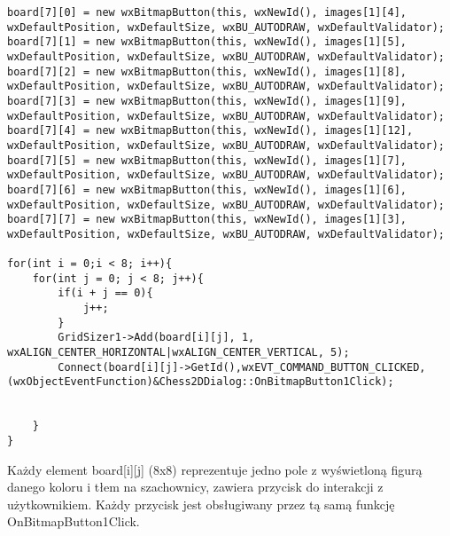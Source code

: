 \documentclass[]{report}
\begin{document}
\begin{lstlisting}
board[7][0] = new wxBitmapButton(this, wxNewId(), images[1][4], wxDefaultPosition, wxDefaultSize, wxBU_AUTODRAW, wxDefaultValidator);
board[7][1] = new wxBitmapButton(this, wxNewId(), images[1][5], wxDefaultPosition, wxDefaultSize, wxBU_AUTODRAW, wxDefaultValidator);
board[7][2] = new wxBitmapButton(this, wxNewId(), images[1][8], wxDefaultPosition, wxDefaultSize, wxBU_AUTODRAW, wxDefaultValidator);
board[7][3] = new wxBitmapButton(this, wxNewId(), images[1][9], wxDefaultPosition, wxDefaultSize, wxBU_AUTODRAW, wxDefaultValidator);
board[7][4] = new wxBitmapButton(this, wxNewId(), images[1][12], wxDefaultPosition, wxDefaultSize, wxBU_AUTODRAW, wxDefaultValidator);
board[7][5] = new wxBitmapButton(this, wxNewId(), images[1][7], wxDefaultPosition, wxDefaultSize, wxBU_AUTODRAW, wxDefaultValidator);
board[7][6] = new wxBitmapButton(this, wxNewId(), images[1][6], wxDefaultPosition, wxDefaultSize, wxBU_AUTODRAW, wxDefaultValidator);
board[7][7] = new wxBitmapButton(this, wxNewId(), images[1][3], wxDefaultPosition, wxDefaultSize, wxBU_AUTODRAW, wxDefaultValidator);

for(int i = 0;i < 8; i++){
	for(int j = 0; j < 8; j++){
		if(i + j == 0){
			j++;
		}
		GridSizer1->Add(board[i][j], 1, wxALIGN_CENTER_HORIZONTAL|wxALIGN_CENTER_VERTICAL, 5);
		Connect(board[i][j]->GetId(),wxEVT_COMMAND_BUTTON_CLICKED,(wxObjectEventFunction)&Chess2DDialog::OnBitmapButton1Click);
		
		
	}
}
\end{lstlisting}
\vspace{\baselineskip}
Każdy element board[i][j] (8x8) reprezentuje jedno pole z wyświetloną figurą danego koloru i tłem na szachownicy, zawiera przycisk do interakcji z użytkownikiem. Każdy przycisk jest obsługiwany przez tą samą funkcję OnBitmapButton1Click.
\end{document}
